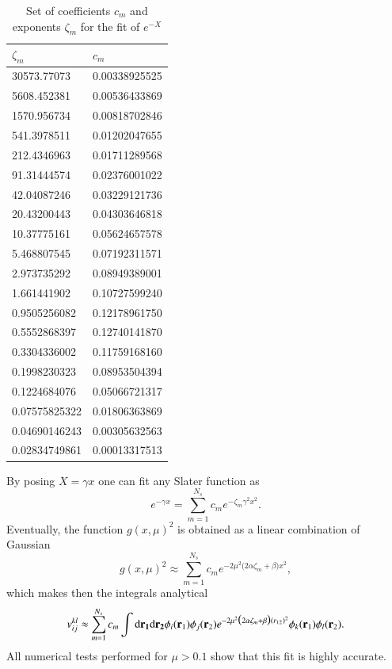 \documentclass[aip,jcp,reprint,noshowkeys,superscriptaddress]{revtex4-1}
\newcommand{\bri}[1]{{\bf r}_{#1}}
\newcommand{\dr}[1]{\text{d}{\bf r_{#1}}}
\begin{document}
\begin{table}
\label{gauss_fit}
\caption{Set of coefficients $c_m$ and exponents $\zeta_m$ for the fit of $e^{-X}$}
\begin{ruledtabular}
\begin{tabular}{ll}
 $\zeta_m$ & $c_m$ \\
\hline                 
   30573.77073         & 0.00338925525  \\
   5608.452381         & 0.00536433869  \\
   1570.956734         & 0.00818702846  \\
   541.3978511         & 0.01202047655  \\
   212.4346963         & 0.01711289568  \\
   91.31444574         & 0.02376001022  \\
   42.04087246         & 0.03229121736  \\
   20.43200443         & 0.04303646818  \\
   10.37775161         & 0.05624657578  \\
   5.468807545         & 0.07192311571  \\
   2.973735292         & 0.08949389001  \\
   1.661441902         & 0.10727599240  \\
   0.9505256082        & 0.12178961750  \\
   0.5552868397        & 0.12740141870  \\
   0.3304336002        & 0.11759168160  \\
   0.1998230323        & 0.08953504394  \\
   0.1224684076        & 0.05066721317  \\
   0.07575825322       & 0.01806363869  \\
   0.04690146243       & 0.00305632563  \\
   0.02834749861       & 0.00013317513  \\
\end{tabular}
\end{ruledtabular}
\end{table}
By posing $X=\gamma x$ one can fit any Slater function as
\begin{equation}
 e^{-\gamma x} = \sum_{m=1}^{N_s} c_m e^{-\zeta_m \gamma^2 x^2}. 
\end{equation}
Eventually, the function $g(x,\mu)^2$ is obtained as a linear combination of Gaussian
\begin{equation}
 g(x,\mu)^2 \approx \sum_{m=1}^{N_s} c_m e^{-2\mu^2\big(2 \alpha \zeta_m + \beta\big) x^2},
\end{equation}
which makes then the integrals analytical
\begin{equation}
 v_{ij}^{kl} \approx \sum_{m=1}^{N_s} c_m \int \dr{1} \dr{2} \phi_i(\bri{1}) \phi_j(\bri{2}) e^{-2\mu^2\big(2 \alpha \zeta_m + \beta\big) (r_{12})^2} \phi_k(\bri{1}) \phi_l(\bri{2}).
\end{equation}
All numerical tests performed for $\mu > 0.1$ show that this fit is highly accurate. 
\end{document}
